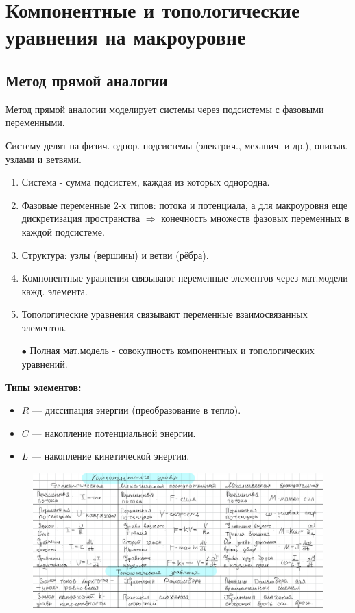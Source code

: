 	\newpage
	
	\section{Компонентные и топологические уравнения на макроуровне}
	
	\subsection{Метод прямой аналогии}
	Метод прямой аналогии моделирует системы через подсистемы с фазовыми переменными.
	\par
	Систему делят на физич. однор. подсистемы (электрич., механич. и др.), описыв. узлами и ветвями.
	
	\begin{enumerate}
		\item Система - сумма подсистем, каждая из которых однородна.
		\item Фазовые переменные 2-х типов: потока и потенциала, а для макроуровня еще дискретизация пространства \(\Rightarrow\) \uline{конечность} множеств фазовых переменных в каждой подсистеме.
		\item Структура: узлы (вершины) и ветви (рёбра).
		\item Компонентные уравнения связывают переменные элементов через мат.модели кажд. элемента.
		\item Топологические уравнения связывают переменные взаимосвязанных элементов.
		\item[$\bullet$] Полная мат.модель - совокупность компонентных и топологических уравнений.
	\end{enumerate}
	
	\textbf{Типы элементов:}
	\begin{itemize}
		\item $R$ — диссипация энергии (преобразование в тепло).
		\item $C$ — накопление потенциальной энергии.
		\item $L$ — накопление кинетической энергии.
	\end{itemize}
	\vspace{-1em}
	\begin{figure}[H]
		\centering
		\includegraphics[width=1\linewidth, height=0.25\textheight]{img/18_01}
		\label{fig:18_01}
	\end{figure}
	
